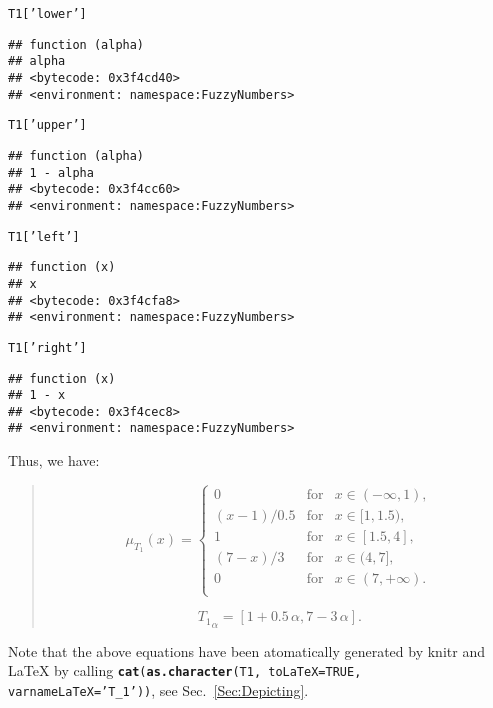 \documentclass[11pt]{article}\usepackage{graphicx, color}
\makeatletter
\newcommand{\hlfunctioncall}[1]{\textcolor[rgb]{0.501960784313725,0,0.329411764705882}{\textbf{#1}}}%
\newcommand{\hlstring}[1]{\textcolor[rgb]{0.6,0.6,1}{#1}}%
\newcommand{\hlargument}[1]{\textcolor[rgb]{0.690196078431373,0.250980392156863,0.0196078431372549}{#1}}%
\newenvironment{kframe}{%
 \def\at@end@of@kframe{}%
 \ifinner\ifhmode%
  \def\at@end@of@kframe{\end{minipage}}%
  \begin{minipage}{\columnwidth}%
 \fi\fi%
 \def\FrameCommand##1{\hskip\@totalleftmargin \hskip-\fboxsep
 \colorbox{shadecolor}{##1}\hskip-\fboxsep
     \hskip-\linewidth \hskip-\@totalleftmargin \hskip\columnwidth}%
 \MakeFramed {\advance\hsize-\width
   \@totalleftmargin\z@ \linewidth\hsize
   \@setminipage}}%
 {\par\unskip\endMakeFramed%
 \at@end@of@kframe}
\newenvironment{knitrout}{}{} %
\newcommand{\package}[1]{\textsf{#1}\xspace}
\newcommand{\func}[1]{\texttt{\hlfunctioncall{#1}}}
\newcommand{\argument}[1]{\texttt{\hlargument{#1}}}
\newcommand{\str}[1]{\texttt{\hlstring{#1}}}
\makeatother
\begin{document}
\begin{knitrout}\small
{}\color{fgcolor}\begin{kframe}
\begin{alltt}
T1[\hlstring{'lower'}]
\end{alltt}
\begin{verbatim}
## function (alpha) 
## alpha
## <bytecode: 0x3f4cd40>
## <environment: namespace:FuzzyNumbers>
\end{verbatim}
\begin{alltt}
T1[\hlstring{'upper'}]
\end{alltt}
\begin{verbatim}
## function (alpha) 
## 1 - alpha
## <bytecode: 0x3f4cc60>
## <environment: namespace:FuzzyNumbers>
\end{verbatim}
\begin{alltt}
T1[\hlstring{'left'}]
\end{alltt}
\begin{verbatim}
## function (x) 
## x
## <bytecode: 0x3f4cfa8>
## <environment: namespace:FuzzyNumbers>
\end{verbatim}
\begin{alltt}
T1[\hlstring{'right'}]
\end{alltt}
\begin{verbatim}
## function (x) 
## 1 - x
## <bytecode: 0x3f4cec8>
## <environment: namespace:FuzzyNumbers>
\end{verbatim}
\end{kframe}
\end{knitrout}



Thus, we have:
\begin{quote}
\[
\mu_{T_1}(x) = \left\{
\begin{array}{lll}
0      & \text{for} & x\in(-\infty,1), \\
(x-1)/0.5 & \text{for} & x\in[1,1.5), \\
1      & \text{for} & x\in[1.5,4], \\
(7-x)/3 & \text{for} & x\in(4,7], \\
0      & \text{for} & x\in(7,+\infty). \\
\end{array}
\right.
\]

\[
{T_1}_\alpha = [1+0.5\,\alpha, 7-3\,\alpha].
\]

\end{quote}

\noindent
Note that the above equations have been atomatically generated by \package{knitr}
and \LaTeX{} by
calling \texttt{\func{cat}(\func{as.character}(T1, \argument{toLaTeX=}TRUE, \argument{varnameLaTeX=}\str{'{}T\_1'{}}))},
see Sec.~\ref{Sec:Depicting}.
\end{document}
